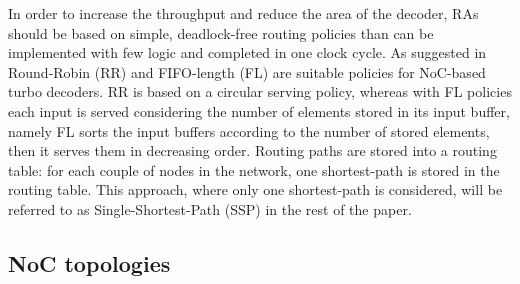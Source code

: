 \documentclass[10pt,twocolumn,journal]{IEEEtran}
\begin{document}
In order to increase the throughput and reduce the area of the decoder, RAs should be based on simple, deadlock-free 
routing policies than can be implemented with few logic and completed in one clock cycle. 
As suggested in \cite{martina_TCASI10} Round-Robin (RR) and FIFO-length (FL) are suitable policies for NoC-based turbo 
decoders. 
RR is based on a circular serving policy, whereas with FL policies each input is served considering 
the number of elements stored in its input buffer, namely 
FL sorts the input buffers according to the number of stored elements, then it serves them in decreasing order.
Routing paths are stored into a routing table: for each couple of nodes in the network, one shortest-path is stored in the 
routing table. This approach, where only one shortest-path is considered, will be referred to as Single-Shortest-Path 
(SSP) \cite{martina_TCASI10} in the rest of the paper.

\subsection{NoC topologies}
\end{document}
